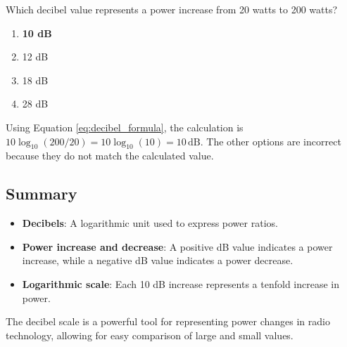 
\begin{tcolorbox}[colback=gray!10!white,colframe=black!75!black,title={T5B11}]
    Which decibel value represents a power increase from 20 watts to 200 watts?
    \begin{enumerate}[label=\Alph*),noitemsep]
        \item \textbf{10 dB}
        \item 12 dB
        \item 18 dB
        \item 28 dB
    \end{enumerate}
\end{tcolorbox}
Using Equation \ref{eq:decibel_formula}, the calculation is \( 10 \log_{10}(200/20) = 10 \log_{10}(10) = 10 \, \text{dB} \). The other options are incorrect because they do not match the calculated value.


\subsection*{Summary}
\begin{itemize}
    \item \textbf{Decibels}: A logarithmic unit used to express power ratios.
    \item \textbf{Power increase and decrease}: A positive dB value indicates a power increase, while a negative dB value indicates a power decrease.
    \item \textbf{Logarithmic scale}: Each 10 dB increase represents a tenfold increase in power.
\end{itemize}
The decibel scale is a powerful tool for representing power changes in radio technology, allowing for easy comparison of large and small values.
